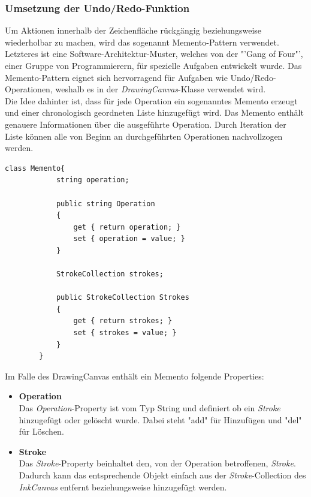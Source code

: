 \subsubsection{Umsetzung der Undo/Redo-Funktion}
Um Aktionen innerhalb der Zeichenfläche rückgängig beziehungsweise wiederholbar zu machen, wird das sogenannt Memento-Pattern verwendet. Letzteres ist eine Software-Architektur-Muster, welches von der "'Gang of Four"', einer Gruppe von Programmierern, für spezielle Aufgaben entwickelt wurde. Das Memento-Pattern eignet sich hervorragend für Aufgaben wie Undo/Redo-Operationen, weshalb es in der \textit{DrawingCanvas}-Klasse verwendet wird.\\
Die Idee dahinter ist, dass für jede Operation ein sogenanntes Memento erzeugt und einer chronologisch geordneten Liste hinzugefügt wird. Das Memento enthält genauere Informationen über die ausgeführte Operation. Durch Iteration der Liste können alle von Beginn an durchgeführten Operationen nachvollzogen werden.\\
\begin{lstlisting}[language = CSharp, captionpos=b, caption={Die Memento-Klasse}]
class Memento{
            string operation;

            public string Operation
            {
                get { return operation; }
                set { operation = value; }
            }

            StrokeCollection strokes;

            public StrokeCollection Strokes
            {
                get { return strokes; }
                set { strokes = value; }
            }
        }
\end{lstlisting}
Im Falle des DrawingCanvas enthält ein Memento folgende Properties:
\begin{itemize}
\item \textbf{Operation}\\
Das \textit{Operation}-Property ist vom Typ String und definiert ob ein \textit{Stroke} hinzugefügt oder gelöscht wurde. Dabei steht "add" für Hinzufügen und "del" für Löschen.
\item \textbf{Stroke}\\
Das \textit{Stroke}-Property beinhaltet den, von der Operation betroffenen, \textit{Stroke}. Dadurch kann das entsprechende Objekt einfach aus der \textit{Stroke}-Collection des \textit{InkCanvas} entfernt beziehungsweise hinzugefügt werden.
\end{itemize}

